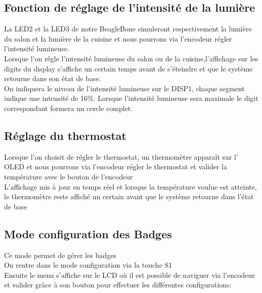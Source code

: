 \subsection{Fonction de réglage de l'intensité de la lumière}
La LED2 et la LED3 de notre BeagleBone simuleront respectivement la lumière du salon et la lumière de la cuisine et nous pourrons via l'encodeur régler l'intensité lumineuse.\\
Lorsque l'on rêgle l'intensité lumineuse du salon ou de la cuisine,l'affichage sur les digits du display s'affiche un certain temps avant de s'éteindre et que le système retourne dans son état de base.\\
On indiquera le niveau de l'intensité lumineuse sur le DISP1, chaque segment indique une intensité de 16\%. Lorsque l'intensité lumineuse sera maximale le digit correspondant formera un cercle complet. 


\subsection{Réglage du thermostat}
Lorsque l'on choisit de régler le thermostat, un thermomètre apparaît sur l' OLED et nous pourrons via l'encodeur régler le thermostat et valider la température avec le bouton de l'encodeur\\
L'affichage mis à jour en temps réel et lorsque la température voulue est atteinte, le thermomètre reste affiché un certain avant que le système retourne dans l'état de base

\subsection{Mode configuration des Badges}
Ce mode permet de gérer les badges\\
On rentre dans le mode configuration via la touche S1\\
Ensuite le menu s'affiche sur le LCD où il est possible de naviguer via l'encodeur et valider grâce à son bouton pour effectuer les différentes configurations:\\

